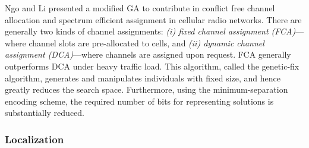 \documentclass[journal]{IEEEtran}
\begin{document}
Ngo and Li \cite{ngo1998fixed} presented a modified GA to contribute in conflict free channel allocation and spectrum efficient assignment in cellular radio networks. There are generally two kinds of channel assignments: \emph{(i) fixed channel assignment (FCA)}---where channel slots are pre-allocated to cells, and \emph{(ii) dynamic channel assignment (DCA)}---where channels are assigned upon request. FCA generally outperforms DCA under heavy traffic load. This algorithm, called the genetic-fix algorithm, generates and manipulates individuals with fixed size, and hence greatly reduces the search space. Furthermore, using the minimum-separation encoding scheme, the required number of bits for representing solutions is substantially reduced. 

\vspace{2mm}
\subsubsection{Localization}
\label{sec:Localization}
\end{document}
